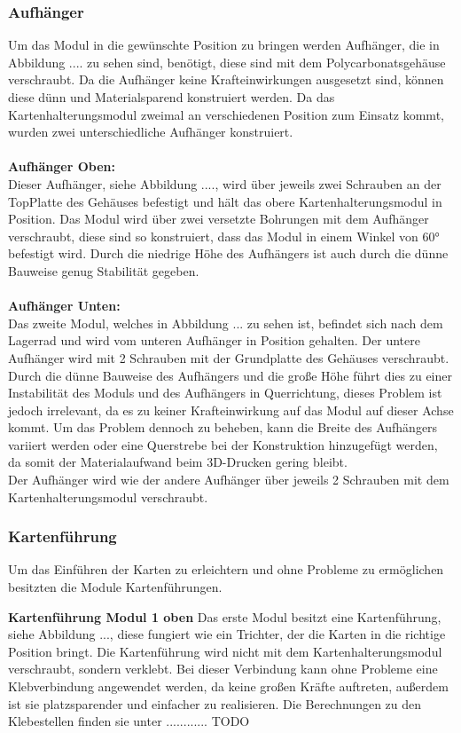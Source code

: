 \subsubsection{Aufhänger}
Um das Modul in die gewünschte Position zu bringen werden Aufhänger, die in Abbildung .... zu sehen sind, benötigt, diese sind mit dem Polycarbonatsgehäuse verschraubt.
Da die Aufhänger keine Krafteinwirkungen ausgesetzt sind, können diese dünn und Materialsparend konstruiert werden.
Da das Kartenhalterungsmodul zweimal an verschiedenen Position zum Einsatz kommt, wurden zwei unterschiedliche
Aufhänger konstruiert.\\\\
\textbf{Aufhänger Oben:} \\
Dieser Aufhänger, siehe Abbildung ...., wird über jeweils zwei Schrauben an der TopPlatte des Gehäuses befestigt und hält das obere Kartenhalterungsmodul in Position.
Das Modul wird über zwei versetzte Bohrungen mit dem Aufhänger verschraubt, diese sind so konstruiert, dass das Modul in einem
Winkel von 60° befestigt wird.
Durch die niedrige Höhe des Aufhängers ist auch durch die dünne Bauweise genug Stabilität gegeben.\\\\
\textbf{Aufhänger Unten:}\\
Das zweite Modul, welches in Abbildung ... zu sehen ist, befindet sich nach dem Lagerrad und wird vom unteren Aufhänger in Position gehalten. Der untere Aufhänger
wird mit 2 Schrauben mit der Grundplatte des Gehäuses verschraubt. Durch die dünne Bauweise des Aufhängers und die
große Höhe führt dies zu einer Instabilität des Moduls und des Aufhängers in Querrichtung, dieses Problem ist jedoch irrelevant, da es
zu keiner Krafteinwirkung auf das Modul auf dieser Achse kommt. Um das Problem dennoch zu beheben, kann die Breite des
Aufhängers variiert werden oder eine Querstrebe bei der Konstruktion hinzugefügt werden, da somit der Materialaufwand beim 3D-Drucken gering bleibt.\\
Der Aufhänger wird wie der andere Aufhänger über jeweils 2 Schrauben mit dem Kartenhalterungsmodul verschraubt.

\subsubsection{Kartenführung}
Um das Einführen der Karten zu erleichtern und ohne Probleme zu ermöglichen besitzten die Module Kartenführungen.

\textbf{Kartenführung Modul 1 oben}
Das erste Modul besitzt eine Kartenführung, siehe Abbildung ..., diese fungiert wie ein Trichter, der die Karten in die richtige Position bringt.
Die Kartenführung wird nicht mit dem Kartenhalterungsmodul verschraubt, sondern
verklebt. Bei dieser Verbindung kann ohne Probleme eine Klebverbindung angewendet werden, da keine großen Kräfte auftreten, außerdem
ist sie platzsparender und einfacher zu realisieren. Die Berechnungen zu den Klebestellen finden sie unter ............ TODO

